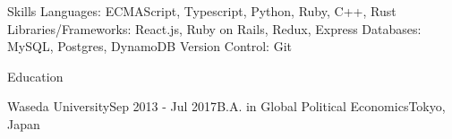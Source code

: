 \documentclass{resume} %
\begin{document}

\begin{rSection}{Skills}
\newline Languages: ECMAScript, Typescript, Python, Ruby, C++, Rust
\newline Libraries/Frameworks: React.js, Ruby on Rails, Redux, Express
\newline Databases: MySQL, Postgres, DynamoDB
\newline Version Control: Git 
\end{rSection}


\begin{rSection}{Education}

\begin{rSubsection}
{Waseda University}{Sep 2013 - Jul 2017}{B.A. in Global Political Economics}{Tokyo, Japan}
\end{rSubsection}

\end{rSection}
\end{document}
